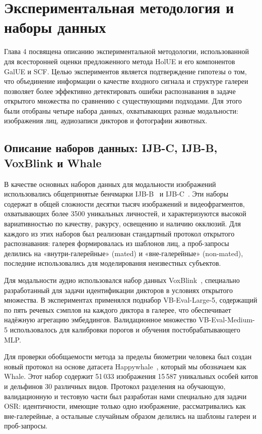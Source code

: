 \chapter{Экспериментальная методология и наборы данных}\label{ch:experiment_setup}
Глава 4 посвящена описанию экспериментальной методологии, использованной для всесторонней оценки предложенного метода HolUE и его компонентов GalUE и SCF.  
Целью экспериментов является подтверждение гипотезы о том, что объединение информации о качестве входного сигнала и структуре галереи позволяет более эффективно детектировать ошибки распознавания в задаче открытого множества по сравнению с существующими подходами.
Для этого были отобраны четыре набора данных, охватывающих разные модальности: изображения лиц, аудиозаписи дикторов и фотографии животных.  
\section{Описание наборов данных: IJB-C, IJB-B, VoxBlink и Whale}\label{sec:experiment_setup/datasets}
В качестве основных наборов данных для модальности изображений использовались общепринятые бенчмарки IJB-B~\cite{ijbb} и IJB-C~\cite{ijbc}.
Эти наборы содержат в общей сложности десятки тысяч изображений и видеофрагментов, охватывающих более 3500 уникальных личностей, и характеризуются высокой вариативностью по качеству, ракурсу, освещению и наличию окклюзий.  
Для каждого из этих наборов был реализован стандартный протокол открытого распознавания: галерея формировалась из шаблонов лиц, а проб-запросы делились на «внутри-галерейные» (mated) и «вне-галерейные» (non-mated), последние использовались для моделирования неизвестных субъектов.

Для модальности аудио использовался набор данных VoxBlink~\cite{voxblink}, специально разработанный для задачи идентификации дикторов в условиях открытого множества.
В экспериментах применялся поднабор VB-Eval-Large-5, содержащий по пять речевых сэмплов на каждого диктора в галерее, что обеспечивает надёжную агрегацию эмбеддингов.  
Валидационное множество VB-Eval-Medium-5 использовалось для калибровки порогов и обучения постобрабатывающего MLP.

Для проверки обобщаемости метода за пределы биометрии человека был создан новый протокол на основе датасета Happywhale~\cite{whale}, который мы обозначаем как Whale.
Этот набор содержит 51\,033 изображения 15\,587 уникальных особей китов и дельфинов 30 различных видов.  
Протокол разделения на обучающую, валидационную и тестовую части был разработан нами специально для задачи OSR: идентичности, имеющие только одно изображение, рассматривались как вне-галерейные, а остальные случайным образом делились на шаблоны галереи и проб-запросы.
